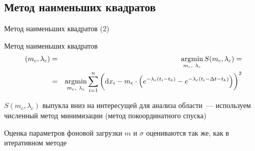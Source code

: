 \documentclass[utf8]{beamer}
\DeclareMathOperator*{\argmin}{\arg\!\min}
\begin{document}
\subsection[МНК]{Метод наименьших квадратов}
\begin{frame}{Метод наименьших квадратов (2)}
\begin{block}{Метод наименьших квадратов}
\begin{eqnarray*}
\del{m_c, \lambda_c} 
  & = & \argmin\limits_{m_c,\ \lambda_c} S(m_c, \lambda_c) = \\
  & = & \argmin\limits_{m_c,\ \lambda_c} \sum\limits_{i=1}^{n} 
    \del{\dif x_i - m_c \cdot 
      \del{e^{-\lambda_c(t_i - t_k)} - 
           e^{-\lambda_c(t_i - \Delta t - t_k)}}}^2
\end{eqnarray*}
\end{block}
$S(m_c, \lambda_c)$ выпукла вниз на интересущей для анализа области~---
используем численный метод минимизации (метод покоординатного спуска)
\end{frame}


\begin{frame}{Оценка параметров фоновой загрузки}
$m$ и $\sigma$ оцениваются так же, как в итеративном методе
\end{frame}






\end{document}
